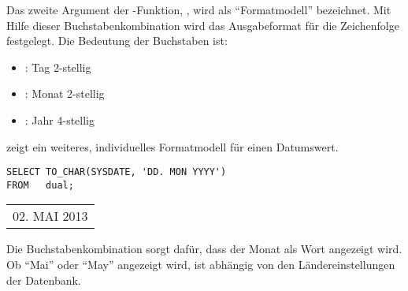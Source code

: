           Das zweite Argument der -Funktion, , wird als \enquote{Formatmodell} bezeichnet. Mit Hilfe dieser Buchstabenkombination wird das Ausgabeformat für die Zeichenfolge festgelegt. Die Bedeutung der Buchstaben ist:
          \begin{itemize}
            \item {}: Tag 2-stellig
            \item {}: Monat 2-stellig
            \item {}: Jahr 4-stellig
          \end{itemize}
           zeigt ein weiteres, individuelles Formatmodell für einen Datumswert.
          \begin{lstlisting}[language=oracle_sql,caption={Ein anderes Formatmodell},label=sql03_30]
SELECT TO_CHAR(SYSDATE, 'DD. MON YYYY')
FROM   dual;
          \end{lstlisting}
          \begin{center}
            \begin{small}
              \tablehead{}

              \begin{oraclesql}
                \begin{supertabular}{l}
                  02. MAI 2013 \\
                \end{supertabular}
              \end{oraclesql}
            \end{small}
          \end{center}
          Die Buchstabenkombination  sorgt dafür, dass der Monat als Wort angezeigt wird. Ob \enquote{Mai} oder \enquote{May} angezeigt wird, ist abhängig von den Ländereinstellungen der Datenbank.

